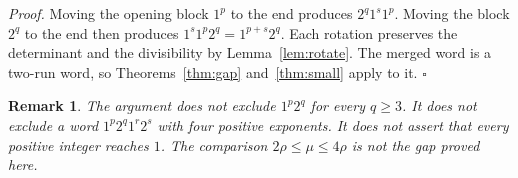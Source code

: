 \documentclass[11pt,letterpaper]{article}
\newtheorem{remark}[theorem]{Remark}
\newenvironment{proof}{\noindent\textit{Proof.}}{\hfill\(\square\)}
\begin{document}
\begin{proof}
Moving the opening block \(1^p\) to the end produces \(2^q1^s1^p\). Moving the block \(2^q\) to the end then produces \(1^s1^p2^q=1^{p+s}2^q\). Each rotation preserves the determinant and the divisibility by Lemma~\ref{lem:rotate}. The merged word is a two-run word, so Theorems~\ref{thm:gap} and~\ref{thm:small} apply to it.
\end{proof}

\begin{remark}
The argument does not exclude \(1^p2^q\) for every \(q\ge 3\). It does not exclude a word \(1^p2^q1^r2^s\) with four positive exponents. It does not assert that every positive integer reaches \(1\). The comparison \(2\rho\le\mu\le 4\rho\) is not the gap proved here.
\end{remark}
\end{document}
